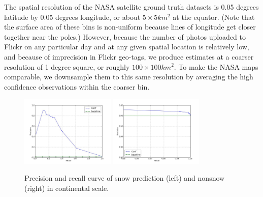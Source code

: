 The spatial resolution of the NASA satellite ground truth datasets is 0.05 degrees
latitude by 0.05 degrees longitude, or about $5 \times 5 km^2$ at the
equator.  (Note that the surface area of these bins is
non-uniform because lines of longitude get closer together near the
poles.)  However, because the number of photos uploaded to Flickr on
any particular day and at any given spatial location is relatively
low, and because of imprecision in Flickr geo-tags, we produce
estimates at a coarser resolution of 1 degree square, or roughly $100
\times 100 km^2$. To make the NASA maps comparable, we downsample them
to this same resolution by averaging the high confidence observations within the coarser bin.

\begin{figure}
\begin{center}
\includegraphics[width=0.40\textwidth]{figs/PR-snow.jpg}
\includegraphics[width=0.40\textwidth]{figs/PR-nonsnow.jpg}

\end{center}
\vspace{-24pt}
\caption{Precision and recall curve of snow prediction (left) and nonsnow (right) in continental scale.}
\label{fig:snowcurve}
\vspace{-12pt}
\end{figure}

